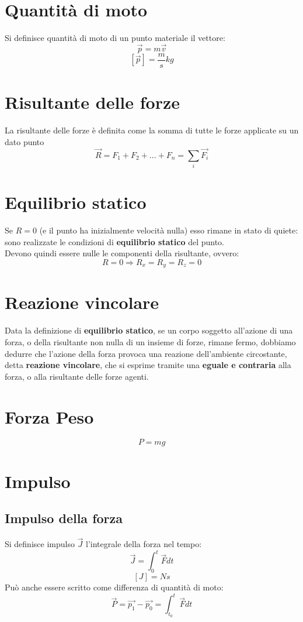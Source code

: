 \documentclass[a4paper]{report}
\begin{document}
  \section{Quantità di moto}
  Si definisce quantità di moto di un punto materiale il vettore:
  $$ \vec{p} = m \vec{v} $$
  $$ [\vec{p}] = \frac{m}{s} kg $$

  \section{Risultante delle forze}
  La risultante delle forze è definita come la somma di tutte le forze applicate su un dato punto
  $$ \vec{R} = F_1 + F_2 + ... + F_n = \sum_{i} \vec{F_i} $$

  \section{Equilibrio statico}
  Se $R = 0$ (e il punto ha inizialmente velocità nulla) esso rimane in stato di quiete: sono realizzate le condizioni di \textbf{equilibrio statico} del punto.\\
  Devono quindi essere nulle le componenti della risultante, ovvero:
  $$ R = 0 \Rightarrow R_x = R_y = R_z = 0 $$

  \section{Reazione vincolare}
  Data la definizione di \textbf{equilibrio statico}, se un corpo soggetto all'azione di una forza, o della risultante non nulla di un insieme di forze, rimane fermo, dobbiamo dedurre che l'azione della forza provoca una reazione dell'ambiente circostante, detta \textbf{reazione vincolare}, che si esprime tramite una \textbf{eguale e contraria} alla forza, o alla risultante delle forze agenti.

  \section{Forza Peso}
  $$ P = mg $$

  \section{Impulso}
  \subsection{Impulso della forza}
  Si definisce impulso $ \vec{J} $ l'integrale della forza nel tempo:
  $$ \vec{J} = \int_0^t \vec{F} dt $$
  $$ [J] = N  s $$
  Può anche essere scritto come differenza di quantità di moto:
  $$\vec{P} = \vec{p_1} - \vec{p_0} = \int_{t_0}^t \vec{F} dt $$
\end{document}
